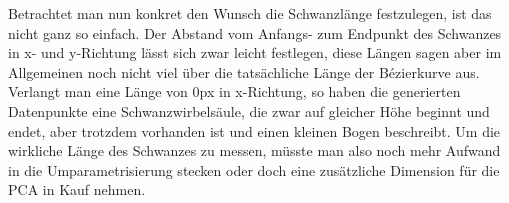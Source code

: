  Betrachtet man nun konkret den Wunsch die Schwanzlänge festzulegen, ist das nicht ganz so einfach. Der Abstand vom Anfangs- zum Endpunkt des Schwanzes in x- und y-Richtung lässt sich zwar leicht festlegen, diese Längen sagen aber im Allgemeinen noch nicht viel über die tatsächliche Länge der Bézierkurve aus. Verlangt man \zb eine Länge von $0$px in x-Richtung, so haben die generierten Datenpunkte eine Schwanzwirbelsäule, die zwar auf gleicher Höhe beginnt und endet, aber trotzdem vorhanden ist und einen kleinen Bogen beschreibt.
 Um die wirkliche Länge des Schwanzes zu messen, müsste man also noch mehr Aufwand in die Umparametrisierung stecken oder doch eine zusätzliche Dimension für die PCA in Kauf nehmen.
 
 
